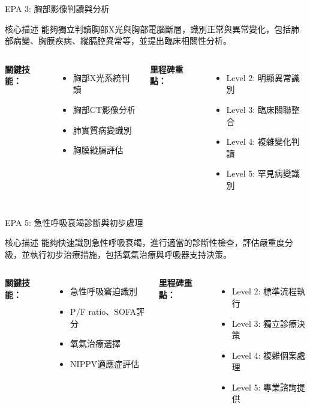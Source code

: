 \documentclass[aspectratio=169]{beamer}
\begin{document}
\begin{frame}{EPA 3: 胸部影像判讀與分析}
\begin{alertblock}{核心描述}
能夠獨立判讀胸部X光與胸部電腦斷層，識別正常與異常變化，包括肺部病變、胸膜疾病、縱膈腔異常等，並提出臨床相關性分析。
\end{alertblock}

\begin{columns}[c]
\textbf{關鍵技能：}
\begin{itemize}
\item 胸部X光系統判讀
\item 胸部CT影像分析
\item 肺實質病變識別
\item 胸膜縱膈評估
\end{itemize}

\textbf{里程碑重點：}
\begin{itemize}
\item Level 2: 明顯異常識別
\item Level 3: 臨床關聯整合
\item Level 4: 複雜變化判讀
\item Level 5: 罕見病變識別
\end{itemize}
\end{columns}
\end{frame}

\begin{frame}{EPA 5: 急性呼吸衰竭診斷與初步處理}
\begin{alertblock}{核心描述}
能夠快速識別急性呼吸衰竭，進行適當的診斷性檢查，評估嚴重度分級，並執行初步治療措施，包括氧氣治療與呼吸器支持決策。
\end{alertblock}

\begin{columns}[c]
\textbf{關鍵技能：}
\begin{itemize}
\item 急性呼吸窘迫識別
\item P/F ratio、SOFA評分
\item 氧氣治療選擇
\item NIPPV適應症評估
\end{itemize}

\textbf{里程碑重點：}
\begin{itemize}
\item Level 2: 標準流程執行
\item Level 3: 獨立診療決策
\item Level 4: 複雜個案處理
\item Level 5: 專業諮詢提供
\end{itemize}
\end{columns}
\end{frame}
\end{document}
